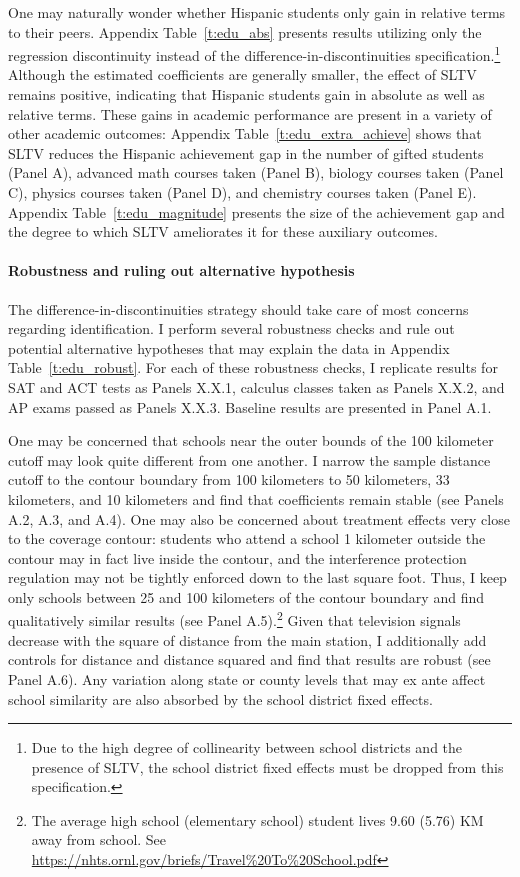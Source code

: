 \documentclass[11pt]{article}
\begin{document}
One may naturally wonder whether Hispanic students only gain in relative terms to their peers. Appendix Table~\ref{t:edu_abs} presents results utilizing only the regression discontinuity instead of the difference-in-discontinuities specification.\footnote{ Due to the high degree of collinearity between school districts and the presence of SLTV, the school district fixed effects must be dropped from this specification.}  Although the estimated coefficients are generally smaller, the effect of SLTV remains positive, indicating that Hispanic students gain in absolute as well as relative terms. These gains in academic performance are present in a variety of other academic outcomes: Appendix Table~\ref{t:edu_extra_achieve} shows that SLTV reduces the Hispanic achievement gap in the number of gifted students (Panel A), advanced math courses taken (Panel B), biology courses taken (Panel C), physics courses taken (Panel D), and chemistry courses taken (Panel E). Appendix Table~\ref{t:edu_magnitude} presents the size of the achievement gap and the degree to which SLTV ameliorates it for these auxiliary outcomes.


\paragraph{Robustness and ruling out alternative hypothesis}

The difference-in-discontinuities strategy should take care of most concerns regarding identification. I perform several robustness checks and rule out potential alternative hypotheses that may explain the data in Appendix Table~\ref{t:edu_robust}. For each of these robustness checks, I replicate results for SAT and ACT tests as Panels X.X.1, calculus classes taken as Panels X.X.2, and AP exams passed as Panels X.X.3. Baseline results are presented in Panel A.1.

One may be concerned that schools near the outer bounds of the 100 kilometer cutoff may look quite different from one another. I narrow the sample distance cutoff to the contour boundary from 100 kilometers to 50 kilometers, 33 kilometers, and 10 kilometers and find that coefficients remain stable (see Panels A.2, A.3, and A.4). One may also be concerned about treatment effects very close to the coverage contour: students who attend a school 1 kilometer outside the contour may in fact live inside the contour, and the interference protection regulation may not be tightly enforced down to the last square foot. Thus, I keep only schools between 25 and 100 kilometers of the contour boundary and find qualitatively similar results (see Panel A.5).\footnote{ The average high school (elementary school) student lives 9.60 (5.76) KM away from school. See \url{https://nhts.ornl.gov/briefs/Travel\%20To\%20School.pdf} } Given that television signals decrease with the square of distance from the main station, I additionally add controls for distance and distance squared and find that results are robust (see Panel A.6). Any variation along state or county levels that may ex ante affect school similarity are also absorbed by the school district fixed effects. 
\end{document}

